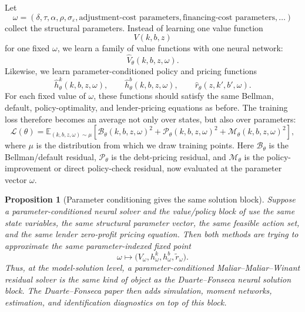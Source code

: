 \documentclass[11pt]{article}
\newtheorem{proposition}{Proposition}
\newcommand{\E}{\mathbb{E}}
\newcommand{\1}{\mathbf{1}}
\begin{document}
Let
\[
  \omega
  =
  (\delta,\tau,\alpha,\rho,\sigma_\varepsilon,\text{adjustment-cost parameters},
  \text{financing-cost parameters},\ldots)
\]
collect the structural parameters. Instead of learning one value function
\[
  V(k,b,z)
\]
for one fixed \(\omega\), we learn a family of value functions with one neural
network:
\[
  \widehat V_\theta(k,b,z,\omega).
\]
Likewise, we learn parameter-conditioned policy and pricing functions
\begin{equation}
  \widehat h^k_\theta(k,b,z,\omega),\qquad
  \widehat h^b_\theta(k,b,z,\omega),\qquad
  \widehat r_\theta(z,k',b',\omega).
  \label{eq:parameter-conditioned-networks}
\end{equation}
For each fixed value of \(\omega\), these functions should satisfy the same
Bellman, default, policy-optimality, and lender-pricing equations as before.
The training loss therefore becomes an average not only over states, but also
over parameters:
\begin{equation}
  \mathcal L(\theta)
  =
  \E_{(k,b,z,\omega)\sim \mu}
  \left[
    \mathcal B_\theta(k,b,z,\omega)^2
    +
    \mathcal P_\theta(k,b,z,\omega)^2
    +
    \mathcal M_\theta(k,b,z,\omega)^2
  \right],
  \label{eq:parameter-conditioned-loss}
\end{equation}
where \(\mu\) is the distribution from which we draw training points. Here
\(\mathcal B_\theta\) is the Bellman/default residual, \(\mathcal P_\theta\) is
the debt-pricing residual, and \(\mathcal M_\theta\) is the policy-improvement
or direct policy-check residual, now evaluated at the parameter vector
\(\omega\).

\begin{proposition}[Parameter conditioning gives the same solution block]
\label{prop:parameter-conditioned-equivalence}
Suppose a parameter-conditioned neural solver and the value/policy block of
\citet{duartefonseca2026ai} use the same state variables, the same structural
parameter vector, the same feasible action set, and the same lender
zero-profit pricing equation. Then both methods are trying to approximate the
same parameter-indexed fixed point
\[
  \omega
  \mapsto
  \bigl(V_\omega,h^k_\omega,h^b_\omega,\widetilde r_\omega\bigr).
\]
Thus, at the model-solution level, a parameter-conditioned
Maliar--Maliar--Winant residual solver is the same kind of object as the
Duarte--Fonseca neural solution block. The Duarte--Fonseca paper then adds
simulation, moment networks, estimation, and identification diagnostics on top
of this block.
\end{proposition}
\end{document}
